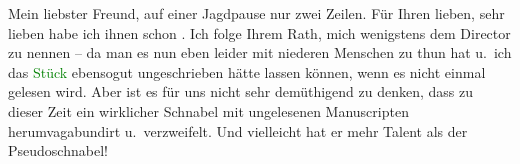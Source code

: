 \pstart{}Mein liebster Freund,\pend\vspace{0.5em}
\pstart
           auf einer Jagdpause nur zwei Zeilen. Für Ihren lieben, sehr lieben \label{K_L03851-1v}\label{K_L03851-1} habe ich ihnen schon \label{K_L03851-2v}\label{K_L03851-2}. Ich folge Ihrem Rath,
               mich wenigstens dem Director zu nennen – da man es nun eben leider mit niederen
               Menschen zu thun hat u. ich das \textcolor{green}{Stück}\ledrightnote{{$\rightarrow$}\emph{\textcolor{green}{Das neue Ghetto. Schauspiel in vier Acten}}} ebensogut ungeschrieben hätte lassen können, wenn es nicht einmal
               gelesen wird. Aber ist es für uns nicht sehr demüthigend zu denken, dass zu dieser
               Zeit ein wirklicher Schnabel mit ungelesenen Manuscripten herumvagabundirt
               u. verzweifelt. Und vielleicht hat er mehr Talent als der Pseudoschnabel! \pend
           
